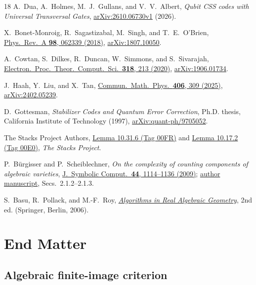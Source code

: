 \documentclass[aps,prl,reprint,notitlepage,nofootinbib,nobibnotes]{revtex4-2}
\begin{document}
\begin{thebibliography}{18}
A.~Dua, A.~Holmes, M.~J.~Gullans, and V.~V.~Albert,
\emph{Qubit CSS codes with Universal Transversal Gates},
\href{https://arxiv.org/abs/2610.06730v1}{arXiv:2610.06730v1} (2026).

X.~Bonet-Monroig, R.~Sagastizabal, M.~Singh, and T.~E.~O'Brien,
\href{https://doi.org/10.1103/PhysRevA.98.062339}
{Phys.\ Rev.\ A \textbf{98}, 062339 (2018)},
\href{https://arxiv.org/abs/1807.10050}{arXiv:1807.10050}.

A.~Cowtan, S.~Dilkes, R.~Duncan, W.~Simmons, and S.~Sivarajah,
\href{https://doi.org/10.4204/EPTCS.318.13}
{Electron.\ Proc.\ Theor.\ Comput.\ Sci.\ \textbf{318}, 213 (2020)},
\href{https://arxiv.org/abs/1906.01734}{arXiv:1906.01734}.

J.~Haah, Y.~Liu, and X.~Tan,
\href{https://doi.org/10.1007/s00220-025-05480-6}
{Commun.\ Math.\ Phys.\ \textbf{406}, 309 (2025)},
\href{https://arxiv.org/abs/2402.05239}{arXiv:2402.05239}.

D.~Gottesman,
\emph{Stabilizer Codes and Quantum Error Correction},
Ph.D. thesis, California Institute of Technology (1997),
\href{https://arxiv.org/abs/quant-ph/9705052}{arXiv:quant-ph/9705052}.

The Stacks Project Authors,
\href{https://stacks.math.columbia.edu/tag/00FR}{Lemma 10.31.6 (Tag 00FR)}
and \href{https://stacks.math.columbia.edu/tag/00E0}{Lemma 10.17.2 (Tag 00E0)},
\emph{The Stacks Project}.

P.~B\"urgisser and P.~Scheiblechner,
\emph{On the complexity of counting components of algebraic varieties},
\href{https://doi.org/10.1016/j.jsc.2008.02.009}{J.~Symbolic Comput.\ \textbf{44}, 1114--1136 (2009)};
\href{https://www.scheiblechner.ch/files/count-comp.pdf}{author manuscript},
Secs.~2.1.2--2.1.3.

S.~Basu, R.~Pollack, and M.-F.~Roy,
\href{https://doi.org/10.1007/3-540-33099-2}
{\emph{Algorithms in Real Algebraic Geometry}},
2nd ed. (Springer, Berlin, 2006).

\end{thebibliography}

\section*{End Matter}
\subsection*{Algebraic finite-image criterion}
\end{document}
